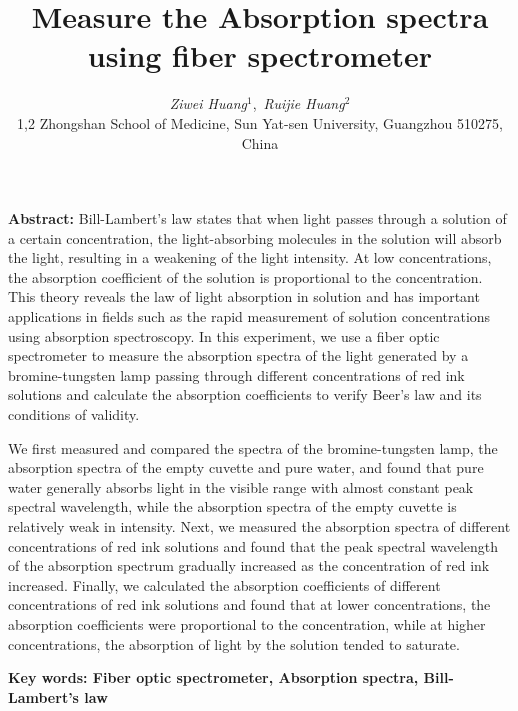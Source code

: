 \documentclass[12pt,a4paper,UTF8]{ctexart}
\begin{document}
\title{\Large\bfseries Measure the Absorption spectra using fiber spectrometer\footnotemark[1]}
\author{\large\textit{Ziwei Huang}$^{1}$\footnotemark[2],\ \large\textit{Ruijie Huang}$^{2}$\footnotemark[3] \\ 
\small{1,2 Zhongshan School of Medicine, Sun Yat-sen University, Guangzhou  { \rm 510275}, China}}
\date{}
\maketitle\thispagestyle{empty} 

\vspace{-1.5em}
\begin{spacing}{1.5}
{\bfseries Abstract:}
Bill-Lambert's law states that when light passes through a solution of a certain concentration, the light-absorbing molecules in the solution will absorb the light, resulting in a weakening of the light intensity. 
At low concentrations, the absorption coefficient of the solution is proportional to the concentration. 
This theory reveals the law of light absorption in solution and has important applications in fields such as the rapid measurement of solution concentrations using absorption spectroscopy. 
In this experiment, we use a fiber optic spectrometer to measure the absorption spectra of the light generated by a bromine-tungsten lamp passing through different concentrations of red ink solutions 
and calculate the absorption coefficients to verify Beer's law and its conditions of validity.

We first measured and compared the spectra of the bromine-tungsten lamp, the absorption spectra of the empty cuvette and pure water, and found that pure water generally absorbs light in the visible range with almost constant peak spectral wavelength, while the absorption spectra of the empty cuvette is relatively weak in intensity. 
Next, we measured the absorption spectra of different concentrations of red ink solutions and found that the peak spectral wavelength of the absorption spectrum gradually increased as the concentration of red ink increased. 
Finally, we calculated the absorption coefficients of different concentrations of red ink solutions and found that at lower concentrations, the absorption coefficients were proportional to the concentration, while at higher concentrations, the absorption of light by the solution tended to saturate.
\par
\bfseries{Key words}: Fiber optic spectrometer, Absorption spectra, Bill-Lambert's law
\vspace{2em}
\end{spacing}

\renewcommand{\thefootnote}{\fnsymbol{footnote}}
\end{document}
